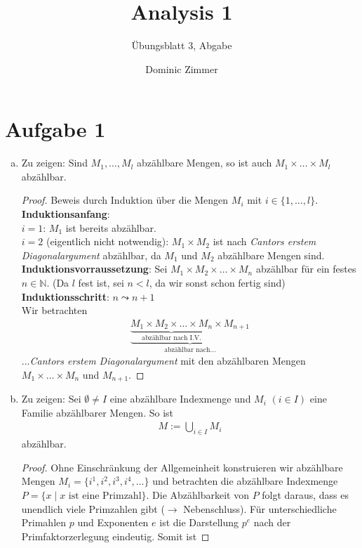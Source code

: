 \documentclass{scrreprt}
\newcommand{\NN}{\mathbb{N}}
\begin{document}
	\title{Analysis 1}
 	\author{Dominic Zimmer}
 	\subtitle{Übungsblatt 3, Abgabe}
 	\publishers{Übungsgruppe: Rami Ahmad}
  	\maketitle 


	\section*{Aufgabe 1}
	\begin{enumerate}[(a)]
		\item
			Zu zeigen: Sind $M_1, \dots, M_l$ abzählbare Mengen, so ist auch $M_1 \times \dots \times M_l$ abzählbar.
			\begin{proof}
				Beweis durch Induktion über die Mengen $M_i$ mit $i \in \lbrace 1, \dots, l\rbrace$.\\
				\textbf{Induktionsanfang}:\\
				$ i = 1$:
				$M_1$ ist bereits abzählbar.\\
				$i = 2$ (eigentlich nicht notwendig): $M_1 \times M_2$ ist nach \emph{Cantors erstem Diagonalargument} abzählbar, da $M_1$ und $M_2$ abzählbare Mengen sind.\\
				\textbf{Induktionsvorraussetzung}: Sei $M_1 \times M_2 \times \dots \times M_n$ abzählbar für ein festes $n \in \NN$. (Da $l$ fest ist, sei $n < l$, da wir sonst schon fertig sind)\\
				\textbf{Induktionsschritt}: $n \leadsto n+1$\\
				Wir betrachten
				\begin{align*}
					\underbrace{\underbrace{M_1 \times M_2 \times \dots \times M_n}_\text{abzählbar nach I.V.}\times M_{n+1}}_\text{abzählbar nach...}
				\end{align*}
				...\emph{Cantors erstem Diagonalargument} mit den abzählbaren Mengen $M_1 \times \dots \times M_n$ und $M_{n+1}$.
			\end{proof}
		\item
			Zu zeigen: Sei $\emptyset \neq I$ eine abzählbare Indexmenge und $M_i$ $(i \in I)$ eine Familie abzählbarer Mengen. So ist
			\begin{align*}
				M := \bigcup\limits_{i \in I} M_i
			\end{align*}
			abzählbar.
			\begin{proof}
				Ohne Einschränkung der Allgemeinheit konstruieren wir abzählbare Mengen $M_i = \lbrace i^1, i^2, i^3, i^4, \dots \rbrace$ und betrachten die abzählbare Indexmenge $P = \lbrace x \mid \text{$x$ ist eine Primzahl}\rbrace$. Die Abzählbarkeit von $P$ folgt daraus, dass es unendlich viele Primzahlen gibt ($\rightarrow$ Nebenschluss). Für unterschiedliche Primahlen $p$ und Exponenten $e$ ist die Darstellung $p^e$ nach der Primfaktorzerlegung eindeutig. Somit ist

\end{proof}
\end{enumerate}
\end{document}
